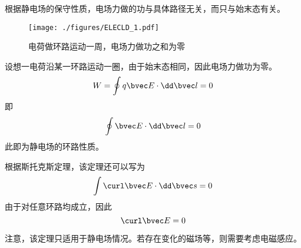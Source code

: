

根据静电场的保守性质，电场力做的功与具体路径无关，而只与始末态有关。
\begin{figure}[ht]
\centering
\texttt{[image: ./figures/ELECLD\_1.pdf]}
\caption{电荷做环路运动一周，电场力做功之和为零} \label{ELECLD_fig1}
\end{figure}

设想一电荷沿某一环路运动一圈，由于始末态相同，因此电场力做功为零。
$$
W = \oint q\bvec E \cdot \dd \bvec l = 0
$$
即
\begin{equation}
\oint \bvec E \cdot \dd \bvec l = 0
\end{equation}
此即为静电场的环路性质。

根据斯托克斯定理，该定理还可以写为
$$\int \curl \bvec E \cdot \dd \bvec s = 0$$
由于对任意环路均成立，因此
\begin{equation}
\curl \bvec E = 0
\end{equation}

注意，该定理只适用于静电场情况。若存在变化的磁场等，则需要考虑电磁感应。